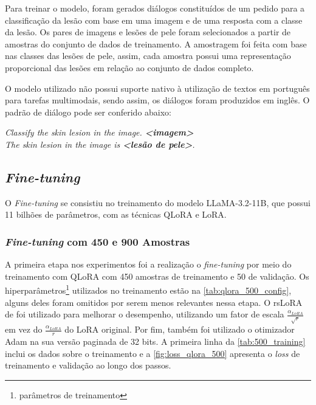 Para treinar o modelo, foram gerados diálogos constituídos de um pedido para a classificação da lesão com base em uma
imagem e de uma resposta com a classe da lesão. Os pares de imagens e lesões de pele foram selecionados a partir de
amostras do conjunto de dados de treinamento. A amostragem foi feita com base nas classes das lesões de pele, assim,
cada amostra possui uma representação proporcional das lesões em relação ao conjunto de dados completo.

O modelo utilizado não possui suporte nativo à utilização de textos em português para tarefas multimodais, sendo assim,
os diálogos foram produzidos em inglês. O padrão de diálogo pode ser conferido abaixo:

\begin{dialogue}
     \textit{Classify the skin lesion in the image. \textbf{<imagem>}} \\
     \textit{The skin lesion in the image is \textbf{<lesão de pele>}.}
\end{dialogue}

\subsection{\textit{Fine-tuning}}

O \textit{Fine-tuning} se consistiu no treinamento do modelo \ac{LLaMA}-3.2-11B, que possui 11 bilhões de parâmetros,
com as técnicas \ac{QLoRA} e \ac{LoRA}.

\subsubsection{\textit{Fine-tuning} com 450 e 900 Amostras}

A primeira etapa nos experimentos foi a realização o \textit{fine-tuning} por meio do treinamento com \ac{QLoRA} com
450 amostras de treinamento e 50 de validação. Os hiperparâmetros\footnote{parâmetros de treinamento} utilizados no
treinamento estão na \autoref{tab:qlora_500_config}, alguns deles foram omitidos por serem menos relevantes nessa
etapa. O \ac{rsLoRA} de \textcite{kalajdzievski2023rank} foi utilizado para melhorar o desempenho, utilizando um fator
de escala \begin{math}\frac{\alpha_{LoRA}}{\sqrt{r}}\end{math} em vez do \begin{math}\frac{\alpha_{LoRA}}{r}\end{math}
do \ac{LoRA} original. Por fim, também foi utilizado o otimizador \ac{Adam} na sua versão paginada de 32 bits. A
primeira linha da \autoref{tab:500_training} inclui os dados sobre o treinamento e a \autoref{fig:loss_qlora_500}
apresenta o \textit{loss} de treinamento e validação ao longo dos passos.

